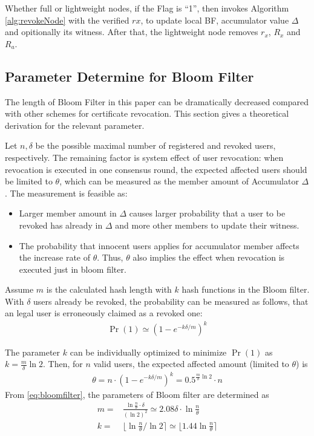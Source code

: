 \documentclass[conference]{IEEEtran}
\begin{document}
Whether full or lightweight nodes, if the Flag is ``1'', then invokes Algorithm \ref{alg:revokeNode} with the verified $rx$, to update local BF, accumulator value $\Delta$ and opitionally its witness.
After that, the lightweight node removes $r_x$, $R_x$ and $R_a$.

\subsection{Parameter Determine for Bloom Filter} \label{section:parameter}

The length of Bloom Filter in this paper can be dramatically decreased compared with other schemes for certificate revocation. This section gives a theoretical derivation for the relevant parameter.

Let $n, \delta$ be the possible maximal number of registered and revoked users, respectively. The remaining factor is system effect of user revocation: when revocation is executed in one consensus round, the expected affected users should be limited to $\theta$, which can be measured as the member amount of Accumulator $\Delta$. The measurement is feasible as:
\begin{itemize}
    \item Larger member amount in $\Delta$ causes larger probability that a user to be revoked has already in $\Delta$ and more other members to update their witness.
    \item The probability that innocent users applies for accumulator member affects the increase rate of $\theta$. Thus, $\theta$ also implies the effect when revocation is executed just in bloom filter.
\end{itemize}

Assume $m$ is the calculated hash length with $k$ hash functions in the Bloom filter. With $\delta$ users already be revoked, the probability can be measured as follows, that an legal user is erroneously claimed as a revoked one: 
\begin{align} 
    \Pr(1) \simeq (1 - e^{-k\delta/m})^k 
 \end{align}

The parameter $k$ can be individually optimized to minimize $\Pr(1)$ as $ k = \frac{m}{\delta}\ln 2$. Then, for $n$ valid users, the expected affected amount (limited to $\theta$) is 
\begin{align}\label{eq:bloomfilter}
    \theta = n \cdot (1 - e^{-k\delta/m})^{k} = 0.5^{\frac{m}{\delta}\ln 2}\cdot n
\end{align}
From \eqref{eq:bloomfilter}, the parameters of Bloom filter are determined as 
\begin{align}
m = & \frac{\ln \frac{n}{\theta} \cdot \delta}{(\ln 2)^2} \simeq 2.08\delta \cdot\ln \frac{n}{\theta}\\
k = & \lfloor \ln \frac{n}{\theta} / \ln 2 \rceil \simeq \lfloor 1.44 \ln \frac{n}{\theta} \rceil
\end{align}
\end{document}
